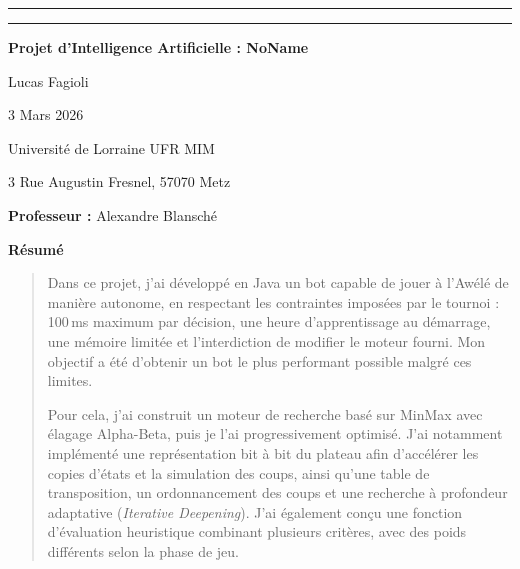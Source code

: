 \documentclass[11pt,a4paper]{article}
\newcommand{\doublebar}{%
  \par\noindent\centering
  \rule{\linewidth}{0.7pt}\par\vspace{-12pt}%
  \rule{\linewidth}{0.7pt}\par
}
\begin{document}
\thispagestyle{empty}
\vspace*{\fill}

\begin{center}
\doublebar
\vspace{0.2cm}

{\LARGE\bfseries Projet d'Intelligence Artificielle : NoName\par}
\vspace{0.7cm}

{\large Lucas Fagioli\par}
\vspace{0.3cm}

{\large 3 Mars 2026\par}
\vspace{0.9cm}

{\normalsize Université de Lorraine UFR MIM\par}
{\normalsize 3 Rue Augustin Fresnel, 57070 Metz\par}
\vspace{0.6cm}

{\normalsize\textbf{Professeur :} Alexandre Blansché\par}
\vspace{0.9cm}

\begin{minipage}{0.9\linewidth}
  \centering
  {\bfseries Résumé\par}
  \vspace{0.35cm}
\begin{quote}
\small
\setlength{\parindent}{1.2em}
\setlength{\parskip}{0.4em}

\hspace*{\parindent}Dans ce projet, j’ai développé en Java un bot capable de jouer à l’Awélé de manière autonome, en respectant
les contraintes imposées par le tournoi : 100\,ms maximum par décision, une heure d’apprentissage au démarrage, une mémoire limitée
et l’interdiction de modifier le moteur fourni. Mon objectif a été d’obtenir un bot le plus performant possible malgré ces limites.

\hspace*{\parindent}Pour cela, j’ai construit un moteur de recherche basé sur MinMax avec élagage Alpha-Beta, puis je l’ai
progressivement optimisé. J’ai notamment implémenté une représentation bit à bit du plateau afin d’accélérer
les copies d’états et la simulation des coups, ainsi qu’une table de transposition, un ordonnancement des coups et une recherche
à profondeur adaptative (\textit{Iterative Deepening}). J’ai également conçu une fonction d’évaluation heuristique combinant
plusieurs critères, avec des poids différents selon la phase de jeu.


\end{quote}
\end{minipage}
\end{center}
\end{document}
